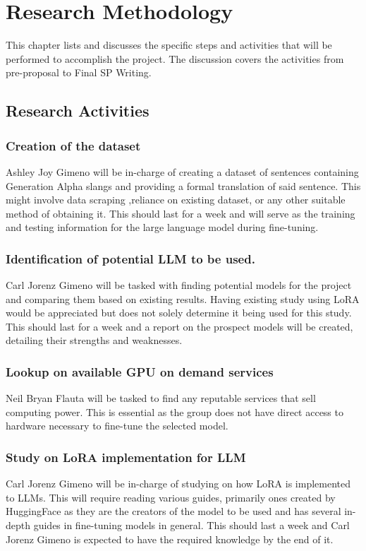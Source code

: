 \chapter{Research Methodology}
This chapter lists and discusses the specific steps and activities that will be performed  to accomplish the project. 
The discussion covers the activities from pre-proposal to Final SP Writing.

\section{Research Activities}
\subsection{Creation of the dataset} 
Ashley Joy Gimeno will be in-charge of creating a dataset of sentences containing Generation Alpha slangs and providing a formal translation of said sentence. This might involve data scraping ,reliance on existing dataset, or any other suitable method of obtaining it. This should last for a week and will serve as the training and testing information for the large language model during fine-tuning. 

\subsection{Identification of potential LLM to be used.} 
Carl Jorenz Gimeno will be tasked with finding potential models for the project and comparing them based on existing results. Having existing study using LoRA would be appreciated but does not solely determine it being used for this study. This should last for a week and a report on the prospect models will be created, detailing their strengths and weaknesses.

\subsection{Lookup on available GPU on demand services} 
Neil Bryan Flauta will be tasked to find any reputable services that sell computing power. This is essential as the group does not have direct access to hardware necessary to fine-tune the selected model.

\subsection{Study on LoRA implementation for LLM}
Carl Jorenz Gimeno will be in-charge of studying on how LoRA is implemented to LLMs. This will require reading various guides, primarily ones created by HuggingFace as they are the creators of the model to be used and has several in-depth guides in fine-tuning models in general. This should last a week and Carl Jorenz Gimeno is expected to have the required knowledge by the end of it.


